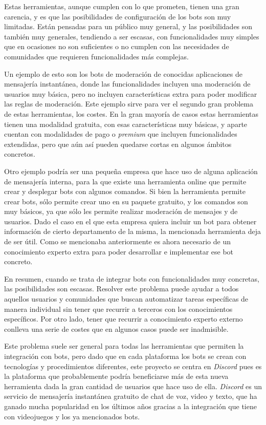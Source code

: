 Estas herramientas, aunque cumplen con lo que prometen, tienen una gran carencia, y es que las posibilidades de configuración de los bots son muy limitadas. Están pensadas para un público muy general, y las posibilidades son también muy generales, tendiendo a ser escasas, con funcionalidades muy simples que en ocasiones no son suficientes o no cumplen con las necesidades de comunidades que requieren funcionalidades más complejas.

Un ejemplo de esto son los bots de moderación de conocidas aplicaciones de mensajería instantánea, donde las funcionalidades incluyen una moderación de usuarios muy básica, pero no incluyen características extra para poder modificar las reglas de moderación. Este ejemplo sirve para ver el segundo gran problema de estas herramientas, los costes. En la gran mayoría de casos estas herramientas tienen una modalidad gratuita, con esas características muy básicas, y aparte cuentan con modalidades de pago o \textit{premium} que incluyen funcionalidades extendidas, pero que aún así pueden quedarse cortas en algunos ámbitos concretos.

Otro ejemplo podría ser una pequeña empresa que hace uso de alguna aplicación de mensajería interna, para la que existe una herramienta online que permite crear y desplegar bots con algunos comandos. Si bien la herramienta permite crear bots, sólo permite crear uno en su paquete gratuito, y los comandos son muy básicos, ya que sólo les permite realizar moderación de mensajes y de usuarios. Dado el caso en el que esta empresa quiera incluir un bot para obtener información de cierto departamento de la misma, la mencionada herramienta deja de ser útil. Como se mencionaba anteriormente es ahora necesario de un conocimiento experto extra para poder desarrollar e implementar ese bot concreto.

En resumen, cuando se trata de integrar bots con funcionalidades muy concretas, las posibilidades son escasas. Resolver este problema puede ayudar a todos aquellos usuarios y comunidades que buscan automatizar tareas específicas de manera individual sin tener que recurrir a terceros con los conocimientos específicos. Por otro lado, tener que recurrir a conocimiento experto externo conlleva una serie de costes que en algunos casos puede ser inadmisible.

Este problema suele ser general para todas las herramientas que permiten la integración con bots, pero dado que en cada plataforma los bots se crean con tecnologías y procedimientos diferentes, este proyecto se centra en \textit{Discord}\cite{discord} pues es la plataforma que probablemente podría beneficiarse más de esta nueva herramienta dada la gran cantidad de usuarios que hace uso de ella. \textit{Discord} es un servicio de mensajería instantánea gratuito de chat de voz, video y texto, que ha ganado mucha popularidad en los últimos años gracias a la integración que tiene con videojuegos y los ya mencionados bots.


